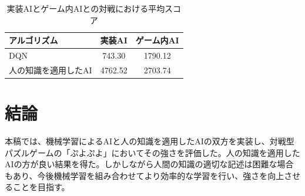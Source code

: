 \documentclass[twocolumn, a4paper]{UECIEresume}
\begin{document}
\begin{table}[tbp]
\begin{center}
\caption{実装AIとゲーム内AIとの対戦における平均スコア} \label{tab:score}
  \begin{tabular}{|l|c|c|} \hline
アルゴリズム & 実装AI & ゲーム内AI\\ \hline
DQN & 743.30 & 1790.12\\ \hline
人の知識を適用したAI & 4762.52 & 2703.74\\ \hline
\end{tabular}
\end{center}
\end{table}


\section{結論}
本稿では、機械学習によるAIと人の知識を適用したAIの双方を実装し、対戦型パズルゲームの「ぷよぷよ」においてその強さを評価した。人の知識を適用したAIの方が良い結果を得た。しかしながら人間の知識の適切な記述は困難な場合もあり、今後機械学習を組み合わせてより効率的な学習を行い、強さを向上させることを目指す。



{\small


}
\end{document}
